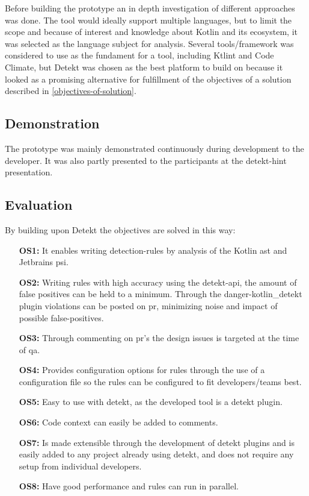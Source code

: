 \documentclass{report}
\begin{document}
Before building the prototype an in depth investigation of different approaches was done. The tool would ideally support multiple languages, but to limit the scope and because of interest and knowledge about Kotlin and its ecosystem, it was selected as the language subject for analysis. Several tools/framework was considered to use as the fundament for a tool, including Ktlint and Code Climate, but Detekt was chosen as the best platform to build on because it looked as a promising alternative for fulfillment of the objectives of a solution described in \ref{objectives-of-solution}.

\subsection*{Demonstration}
The prototype was mainly demonstrated continuously during development to the developer. It was also partly presented to the participants at the detekt-hint presentation.

\subsection*{Evaluation}

By building upon Detekt the objectives are solved in this way:
\begin{itemize}
    \item [\textbf{OS1:}] It enables writing detection-rules by analysis of the Kotlin \gls{ast} and Jetbrains \gls{psi}.
    
    \item [\textbf{OS2:}] Writing rules with high accuracy using the detekt-api, the amount of false positives can be held to a minimum. Through the danger-kotlin\_detekt plugin violations can be posted on \gls{pr}, minimizing noise and impact of possible false-positives.
    
    \item [\textbf{OS3:}] Through commenting on \gls{pr}'s the design issues is targeted at the time of \gls{qa}.
    
    \item [\textbf{OS4:}] Provides configuration options for rules through the use of a configuration file so the rules can be configured to fit developers/teams best.
    
    \item [\textbf{OS5:}] Easy to use with detekt, as the developed tool is a detekt plugin.
    
    \item [\textbf{OS6:}] Code context can easily be added to comments.
    
    \item [\textbf{OS7:}] Is made extensible through the development of detekt plugins and is easily added to any project already using detekt, and does not require any setup from individual developers.

    \item [\textbf{OS8:}] Have good performance and rules can run in parallel. 
\end{itemize}
\end{document}
